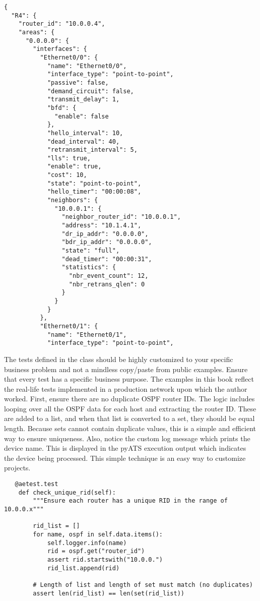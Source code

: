 \begin{verbatim}
{
  "R4": {
    "router_id": "10.0.0.4",
    "areas": {
      "0.0.0.0": {
        "interfaces": {
          "Ethernet0/0": {
            "name": "Ethernet0/0",
            "interface_type": "point-to-point",
            "passive": false,
            "demand_circuit": false,
            "transmit_delay": 1,
            "bfd": {
              "enable": false
            },
            "hello_interval": 10,
            "dead_interval": 40,
            "retransmit_interval": 5,
            "lls": true,
            "enable": true,
            "cost": 10,
            "state": "point-to-point",
            "hello_timer": "00:00:08",
            "neighbors": {
              "10.0.0.1": {
                "neighbor_router_id": "10.0.0.1",
                "address": "10.1.4.1",
                "dr_ip_addr": "0.0.0.0",
                "bdr_ip_addr": "0.0.0.0",
                "state": "full",
                "dead_timer": "00:00:31",
                "statistics": {
                  "nbr_event_count": 12,
                  "nbr_retrans_qlen": 0
                }
              }
            }
          },
          "Ethernet0/1": {
            "name": "Ethernet0/1",
            "interface_type": "point-to-point",
\end{verbatim}

The tests defined in the class should be highly customized to your specific
business problem and not a mindless copy/paste from public examples. Ensure
that every test has a specific business purpose. The examples in this book
reflect the real-life tests implemented in a production network upon which
the author worked. First, ensure there are no duplicate OSPF router IDs. The
logic includes looping over all the OSPF data for each host and extracting
the router ID\@. These are added to a list, and when that list is converted to
a set, they should be equal length. Because sets cannot contain duplicate
values, this is a simple and efficient way to ensure uniqueness. Also,
notice the custom log message which prints the device name. This
is displayed in the pyATS execution output which indicates the device
being processed. This simple technique is an easy way to customize projects.

\begin{verbatim}
   @aetest.test
    def check_unique_rid(self):
        """Ensure each router has a unique RID in the range of 10.0.0.x"""

        rid_list = []
        for name, ospf in self.data.items():
            self.logger.info(name)
            rid = ospf.get("router_id")
            assert rid.startswith("10.0.0.")
            rid_list.append(rid)

        # Length of list and length of set must match (no duplicates)
        assert len(rid_list) == len(set(rid_list))
\end{verbatim}

